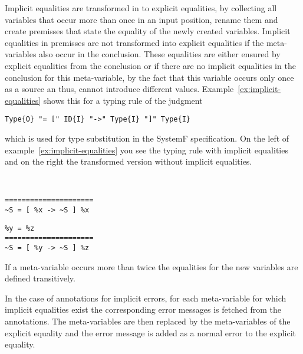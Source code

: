Implicit equalities are transformed in to explicit equalities, by
collecting all variables that occur more than once in an input
position, rename them and create premisses that state the equality of
the newly created variables. Implicit equalities in premisses are not
transformed into explicit equalities if the meta-variables also occur
in the conclusion. These equalities are either ensured by explicit
equalities from the conclusion or if there are no implicit equalities
in the conclusion for this meta-variable, by the fact that this
variable occurs only once as a source an thus, cannot introduce
different values. Example~\ref{ex:implicit-equalities} shows this for
a typing rule of the judgment

\begin{verbatim}
Type{O} "= [" ID{I} "->" Type{I} "]" Type{I}
\end{verbatim}

which is used for type substitution in the SystemF specification. On
the left of example~\ref{ex:implicit-equalities} you see the typing
rule with implicit equalities and on the right the transformed version
without implicit equalities.

\begin{example}{~}
\newline
  \begin{minipage}[b]{.45\linewidth}
    \begin{verbatim}
=====================
~S = [ %x -> ~S ] %x
\end{verbatim}
  \end{minipage}
  \begin{minipage}[b]{.45\linewidth}
    \begin{verbatim}
%y = %z
=====================
~S = [ %y -> ~S ] %z
\end{verbatim}
  \end{minipage}
\label{ex:implicit-equalities}
\end{example}

If a meta-variable occurs more than twice the equalities for the new
variables are defined transitively.

In the case of annotations for implicit errors, for each meta-variable
for which implicit equalities exist the corresponding error messages
is fetched from the annotations. The meta-variables are then replaced
by the meta-variables of the explicit equality and the error message
is added as a normal error to the explicit equality.


